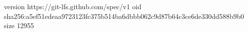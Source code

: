version https://git-lfs.github.com/spec/v1
oid sha256:a5ef51edeaa9723123fc375b514ba6dbbb062c9d87b64c3ce6de330dd588b9b0
size 12955

